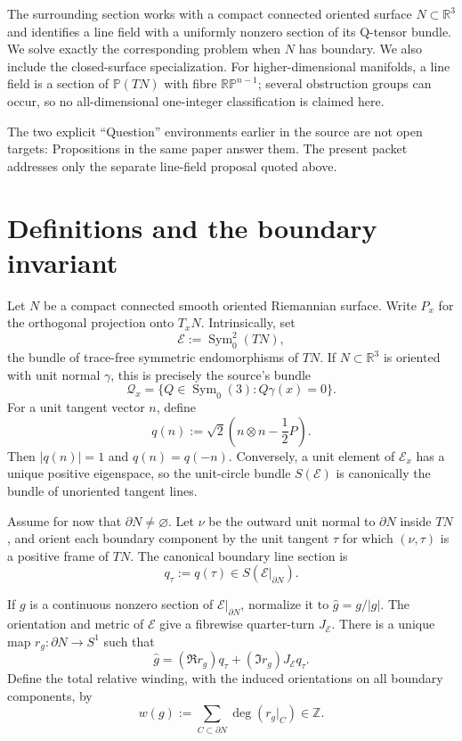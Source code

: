\documentclass[11pt]{article}
\theoremstyle{definition}
\theoremstyle{remark}
\newcommand{\E}{\mathcal E}
\newcommand{\Q}{\mathcal Q}
\newcommand{\Sym}{\operatorname{Sym}}
\newcommand{\bd}{\partial}
\begin{document}
The surrounding section works with a compact connected oriented surface
$N\subset\mathbb R^3$ and identifies a line field with a uniformly nonzero
section of its Q-tensor bundle.  We solve exactly the corresponding problem
when $N$ has boundary.  We also include the closed-surface specialization.
For higher-dimensional manifolds, a line field is a section of
$\mathbb P(TN)$ with fibre $\mathbb{RP}^{n-1}$; several obstruction groups can
occur, so no all-dimensional one-integer classification is claimed here.

The two explicit ``Question'' environments earlier in the source are not open
targets: Propositions in the same paper answer them.  The present packet
addresses only the separate line-field proposal quoted above.

\section{Definitions and the boundary invariant}

Let $N$ be a compact connected smooth oriented Riemannian surface.  Write
$P_x$ for the orthogonal projection onto $T_xN$.  Intrinsically, set
\[
  \E:=\Sym^2_0(TN),
\]
the bundle of trace-free symmetric endomorphisms of $TN$.  If
$N\subset\mathbb R^3$ is oriented with unit normal $\gamma$, this is precisely
the source's bundle
\[
 \Q_x=\{Q\in\Sym_0(3):Q\gamma(x)=0\}.
\]
For a unit tangent vector $n$, define
\begin{equation}\label{eq:qline}
 q(n):=\sqrt2\left(n\otimes n-\frac12P\right).
\end{equation}
Then $|q(n)|=1$ and $q(n)=q(-n)$.  Conversely, a unit element of $\E_x$
has a unique positive eigenspace, so the unit-circle bundle $S(\E)$ is
canonically the bundle of unoriented tangent lines.

Assume for now that $\bd N\ne\varnothing$.  Let $\nu$ be the outward unit
normal to $\bd N$ inside $TN$, and orient each boundary component by the unit
tangent $\tau$ for which $(\nu,\tau)$ is a positive frame of $TN$.  The
canonical boundary line section is
\begin{equation}\label{eq:qtau}
 q_\tau:=q(\tau)\in S(\E|_{\bd N}).
\end{equation}

If $g$ is a continuous nonzero section of $\E|_{\bd N}$, normalize it to
$\widehat g=g/|g|$.  The orientation and metric of $\E$ give a fibrewise
quarter-turn $J_\E$.  There is a unique map $r_g:\bd N\to S^1$ such that
\begin{equation}\label{eq:relativephase}
 \widehat g=(\Re r_g)q_\tau+(\Im r_g)J_\E q_\tau.
\end{equation}
Define the total relative winding, with the induced orientations on all
boundary components, by
\begin{equation}\label{eq:wcontinuous}
 w(g):=\sum_{C\subset\bd N}\deg(r_g|_C)\in\mathbb Z.
\end{equation}
\end{document}

